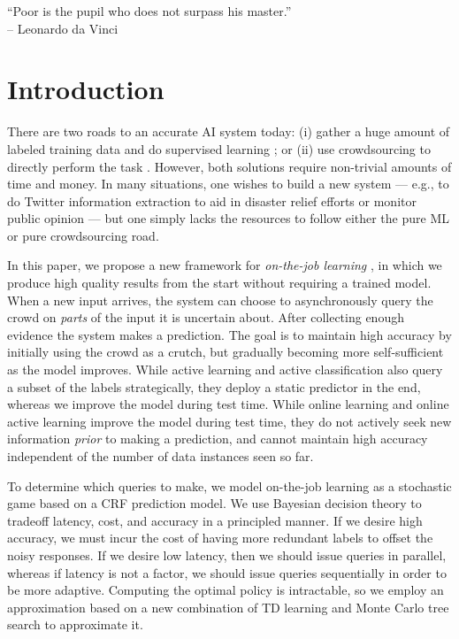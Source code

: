 \begin{epigraph}
``Poor is the pupil who does not surpass his master.''\\
-- Leonardo da Vinci
\end{epigraph}

\section{Introduction}
\label{sec:intro}

There are two roads to an accurate AI system today:
(i) gather a huge amount of labeled training data \citep{deng2009imagenet} and do supervised learning \citep{krizhevsky2012imagenet};
or (ii) use crowdsourcing to directly perform the task \citep{bernstein2010soylent,kokkalis2013emailvalet}.
However, both solutions require non-trivial amounts of time and money.
In many situations, one wishes to build a new system --- e.g., to do Twitter information extraction
\citep{li2012twiner} to aid in disaster relief efforts or monitor public
opinion --- but one simply lacks the resources to follow either the pure ML or pure crowdsourcing road.

In this paper, we propose a new framework for \emph{on-the-job learning} \citep{lasecki2013real},
in which we produce high quality results from the start without requiring a trained model.
When a new input arrives,
the system can choose to asynchronously query the crowd on \emph{parts} of the input it is
uncertain about. After collecting enough evidence the system makes a prediction.
The goal is to maintain high accuracy by initially using the crowd as a crutch,
but gradually becoming more self-sufficient as the model improves.
While active learning \citep{settles2010active} and active classification \citep{gao2011active}
also query a subset of the labels strategically,
they deploy a static predictor in the end,
whereas we improve the model during test time.
While online learning \citep{cesabianchi06prediction} and
online active learning \citep{helmbold1997some,sculley2007online,chu2011unbiased}
improve the model during test time,
they do not actively seek new information \emph{prior} to making a prediction,
and cannot maintain high accuracy independent of the number of data instances seen so far.

To determine which queries to make,
we model on-the-job learning as a stochastic game based on a CRF prediction model.
We use Bayesian decision theory to tradeoff latency, cost, and accuracy in a principled manner.
If we desire high accuracy, we must incur the cost of having more redundant labels
to offset the noisy responses.  If we desire low latency, then we should issue queries
in parallel, whereas if latency is not a factor, we should issue queries
sequentially in order to be more adaptive.
Computing the optimal policy is intractable,
so we employ an approximation
based on a new combination of TD learning \citep{sutton1988learning}
and Monte Carlo tree search \citep{kocsis2006bandit} to approximate it.

